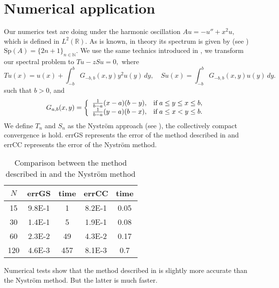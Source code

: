 \documentclass[
11pt,%
tightenlines,%
twoside,%
onecolumn,%
nofloats,%
nobibnotes,%
nofootinbib,%
superscriptaddress,%
noshowpacs,%
centertags]%
{revtex4}
\begin{document}
\section{Numerical application}
Our numerics test are doing under the harmonic oscillation
$
    Au=-u''+x^2u,
$ which is defined in $L^{2}(\mathbb{R})$. As is known, in theory
its spectrum is given by (see \cite{bib16})
$
    \mbox{Sp}(A)=\{2n+1\}_{n\in\mathbb{N}}.
$
We use the same technics introduced in \cite{bib16}, we transform our spectral problem to
$
    Tu-zSu=0,
$
where
\begin{equation*}
    Tu(x)=u(x)+\int_{-b}^{b}G_{-b,b}(x,y)y^{2}u(y)\,dy,\quad Su(x)=\int_{-b}^{b}G_{-b,b}(x,y)u(y)\,dy.
\end{equation*}
such that $b>0$, and
\begin{equation*}
    G_{a,b}(x,y)=\left\{
              \begin{array}{ll}
                \frac{1}{b-a}(x-a)(b-y), & \mbox{if\;}a\leq y\leq x \leq b, \\
               \frac{1}{b-a}(y-a)(b-x), & \mbox{if\;}a\leq x< y \leq b .
              \end{array}
            \right.
\end{equation*}
We define $T_n$ and $S_n$ as the Nystr\"om approach (see \cite{bib17}), the collectively compact convergence is hold. errGS represents the error of the method described in \cite{bib16} and errCC represents the error of the Nystr\"om method.

\begin{table}[ht]
\begin{center}
\begin{tabular}{|c|c|c|c|c|}
\hline
$N$&errGS&time &errCC&time\\
\hline
 15& 9.8E-1&1  &8.2E-1&0.05\\
 30& 1.4E-1&5  &1.9E-1&0.08\\
 60& 2.3E-2&49 &4.3E-2&0.17\\
120& 4.6E-3&457&8.1E-3&0.7\\
\hline
\end{tabular}
\caption{Comparison between the method described in\cite{bib16} and the Nystr\"om method}
\end{center}
\end{table}

Numerical tests show that the method described in \cite{bib16} is slightly more accurate than the Nystr\"om method. But the latter is much faster.
\end{document}
